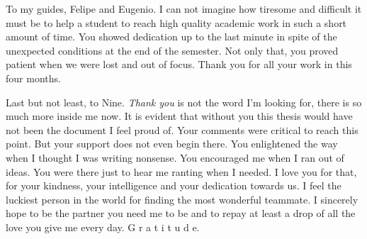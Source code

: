 \documentclass[english, a4paper, 12pt]{article}
\begin{document}
To my guides, Felipe and Eugenio. I can not imagine how tiresome and difficult it must be to help a student to reach high quality academic work in such a short amount of time. You showed dedication up to the last minute in spite of the unexpected conditions at the end of the semester. Not only that, you proved patient when we were lost and out of focus. Thank you for all your work in this four months.

\newpage
Last but not least, to Nine. \textit{Thank you} is not the word I'm looking for, there is so much more inside me now. It is evident that without you this thesis would have not been the document I feel proud of. Your comments were critical to reach this point. But your support does not even begin there. You enlightened the way when I thought I was writing nonsense. You encouraged me when I ran out of ideas. You were there just to hear me ranting when I needed. I love you for that, for your kindness, your intelligence and your dedication towards us. I feel the luckiest person in the world for finding the most wonderful teammate. I sincerely hope to be the partner you need me to be and to repay at least a drop of all the love you give me every day. G r a t i t u d e.



\end{document}
